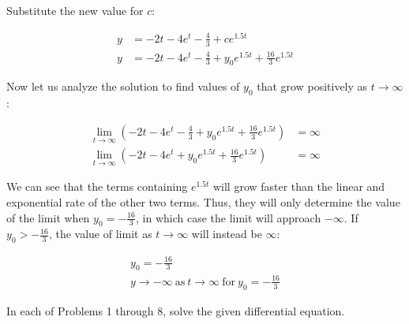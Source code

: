 \documentclass{lapchomework}
\begin{document}
\begin{problems}
\begin{solution}
\step Substitute the new value for $c$:

\step \begin{align*}
y & = -2t - 4e^t - \frac{4}{3} + ce^{1.5t} \\
y & = -2t - 4e^t - \frac{4}{3} + y_0e^{1.5t} + \frac{16}{3}e^{1.5t}
\end{align*}

\step Now let us analyze the solution to find values of $y_0$ that grow 
positively as $t \to \infty$:

\step \begin{align*}
\lim_{t \to \infty} \left(-2t - 4e^t - \frac{4}{3} + y_0e^{1.5t} 
+ \frac{16}{3}e^{1.5t}\right) & = \infty \\
\lim_{t \to \infty} \left(-2t - 4e^t + y_0e^{1.5t} 
+ \frac{16}{3}e^{1.5t}\right) & = \infty
\end{align*}

\step We can see that the terms containing $e^{1.5t}$ will grow faster than the 
linear and exponential rate of the other two terms. Thus, they will only 
determine the value of the limit when $y_0 = -\frac{16}{3}$, in which case the 
limit will approach $-\infty$. If $y_0 > - \frac{16}{3}$, the value of limit 
as $t \to \infty$ will instead be $\infty$:

\step \begin{gather*}
\boxed{y_0 = - \frac{16}{3}} \\
\boxed{y \to - \infty \: \text{as} \: t \to \infty \: \text{for} \: y_0 
= -\frac{16}{3}}
\end{gather*}

\end{solution}

\end{problems}


\begin{instructions}
In each of Problems 1 through 8, solve the given differential equation.
\end{instructions}
\end{document}
